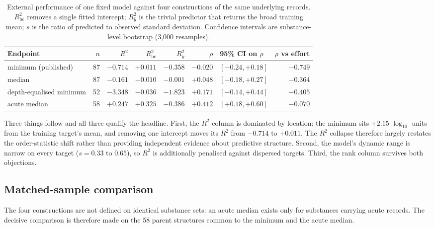 \documentclass[11pt]{article}
\begin{document}
\begin{table}[h]
\centering
\caption{External performance of one fixed model against four constructions of
the same underlying records. $R^2_{\mathrm{bc}}$ removes a single fitted
intercept; $R^2_{\bar y}$ is the trivial predictor that returns the broad
training mean; $s$ is the ratio of predicted to observed standard deviation.
Confidence intervals are substance-level bootstrap (3{,}000 resamples).}
\small
\begin{tabular}{lrrrrrlr}
\toprule
Endpoint & $n$ & $R^2$ & $R^2_{\mathrm{bc}}$ & $R^2_{\bar y}$ & $\rho$ & 95\% CI on $\rho$ & $\rho$ vs effort \\
\midrule
minimum (published)     & 87 & $-0.714$ & $+0.011$ & $-0.358$ & $-0.020$ & $[-0.24,+0.18]$ & $-0.749$ \\
median                  & 87 & $-0.161$ & $-0.010$ & $-0.001$ & $+0.048$ & $[-0.18,+0.27]$ & $-0.364$ \\
depth-equalised minimum & 52 & $-3.348$ & $-0.036$ & $-1.823$ & $+0.171$ & $[-0.14,+0.44]$ & $-0.405$ \\
acute median            & 58 & $+0.247$ & $+0.325$ & $-0.386$ & $+0.412$ & $[+0.18,+0.60]$ & $-0.070$ \\
\bottomrule
\end{tabular}
\end{table}

Three things follow and all three qualify the headline. First, the $R^2$ column
is dominated by location: the minimum sits $+2.15$ $\log_{10}$ units from the
training target's mean, and removing one intercept moves its $R^2$ from $-0.714$
to $+0.011$. The $R^2$ collapse therefore largely restates the order-statistic
shift rather than providing independent evidence about predictive structure.
Second, the model's dynamic range is narrow on every target ($s=0.33$ to
$0.65$), so $R^2$ is additionally penalised against dispersed targets. Third,
the rank column survives both objections.

\subsection*{Matched-sample comparison}

The four constructions are not defined on identical substance sets: an acute
median exists only for substances carrying acute records. The decisive
comparison is therefore made on the 58 parent structures common to the minimum
and the acute median.
\end{document}
